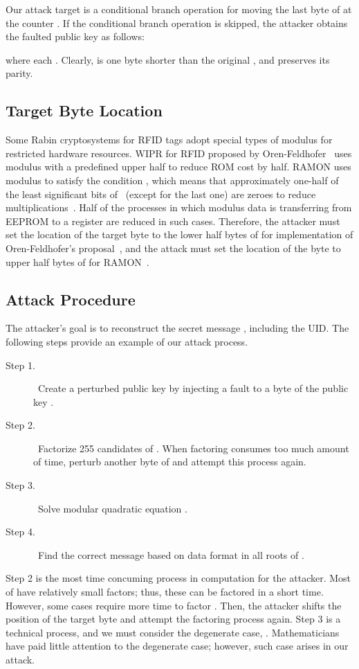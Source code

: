 \documentclass{article}
\begin{document}
Our attack target is a conditional branch operation for moving 
the last byte of  at the counter .
If the conditional branch operation is 
skipped, the attacker obtains the faulted public key  as follows:

where each .
Clearly,  is one byte shorter than the original , and preserves its parity.

\subsection{Target Byte Location}
Some Rabin cryptosystems for RFID tags adopt special types of modulus  for restricted hardware resources.
WIPR for RFID proposed by Oren-Feldhofer~\cite{Oren-Feldhofer2} uses 
modulus  with a predefined upper half to reduce ROM cost by half.
RAMON uses modulus  to satisfy the condition , which means 
that approximately one-half of the least significant bits of ~(except for the last one) are zeroes 
to reduce multiplications~\cite{RAMON}.
Half of the processes in which modulus data is transferring from EEPROM to a register are reduced in 
such cases.
Therefore, the attacker must set the location of the target byte to the lower half bytes of  
for implementation of 
Oren-Feldhofer's proposal~\cite{Oren-Feldhofer2}, and the attack must set the 
location of the byte to upper half bytes of  for RAMON~\cite{RAMON}.


\subsection{Attack Procedure}\label{AP}
The attacker's goal is to reconstruct the secret message , including the UID.
The following steps provide an example of our attack process. 
\begin{description}
\item[Step 1.] ~Create a perturbed public key  
by injecting a fault to a byte of the public key .
\item[Step 2.] ~Factorize 255 candidates  of . 
When factoring consumes too much amount of time, perturb another byte of  and attempt this process again.
\item[Step 3.] ~Solve modular quadratic equation .
\item[Step 4.] ~Find the correct message  based on data format in all roots of .
\end{description}
Step 2 is the most time concuming process in computation for the attacker. 
Most of  have relatively small factors; thus, these 
can be factored in a short time.
However, some cases require more time to factor . Then, the attacker 
shifts the position of the target byte and attempt the factoring process again. 
Step 3 is a technical process, and we must consider the degenerate case, 
.
Mathematicians have paid little attention to the degenerate case; however, 
such case arises in our attack. 
\end{document}
